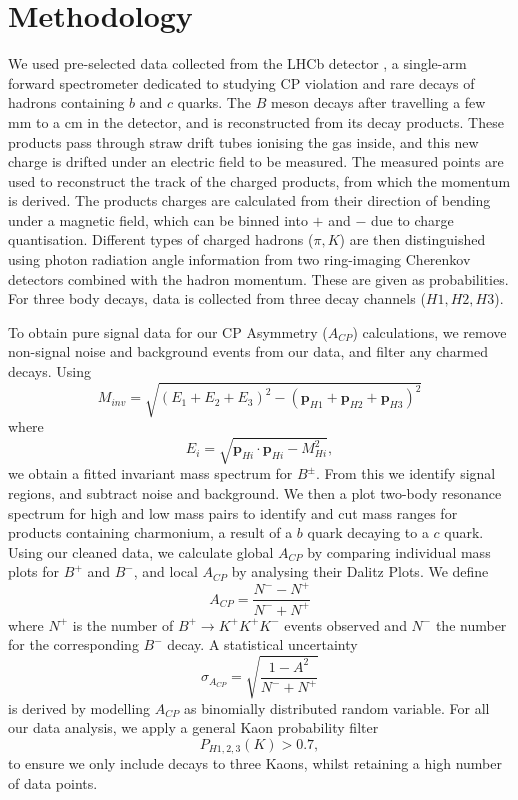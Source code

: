 \documentclass[11pt, twocolumn]{article}
\begin{document}
\section{Methodology}
We used pre-selected data collected from the LHCb detector \cite{cern}, a single-arm forward spectrometer dedicated to studying CP violation and rare decays of hadrons containing $b$ and $c$ quarks. The $B$ meson decays after travelling a few mm to a cm in the detector, and is reconstructed from its decay products. These products pass through straw drift tubes \cite{straw} ionising the gas inside, and this new charge is drifted under an electric field to be measured. The measured points are used to reconstruct the track of the charged products, from which the momentum is derived. The products charges are calculated from their direction of bending under a magnetic field, which can be binned into $+$ and $-$ due to charge quantisation. Different types of charged hadrons ($\pi, K$) are then distinguished using photon radiation angle information from two ring-imaging Cherenkov detectors \cite{cherenkov} combined with the hadron momentum. These are given as probabilities. For three body decays, data is collected from three decay channels ($H1, H2, H3$).

To obtain pure signal data for our CP Asymmetry ($A_{CP}$) calculations, we remove non-signal noise and background events from our data, and filter any charmed decays. Using
\begin{equation}
    M_{inv} = \sqrt{(E_1 + E_2 + E_3)^2 - (\bm{p}_{H1} + \bm{p}_{H2} + \bm{p}_{H3})^2}
\end{equation}
where 
\begin{equation}
    E_i = \sqrt{\bm{p}_{Hi} \cdot \bm{p}_{Hi} - M_{Hi}^2},  
\end{equation}
we obtain a fitted invariant mass spectrum for $B^{\pm}$. From this we identify signal regions, and subtract noise and background. We then a plot two-body resonance spectrum for high and low mass pairs to identify and cut mass ranges for products containing charmonium, a result of a $b$ quark decaying to a $c$ quark. Using our cleaned data, we calculate global $A_{CP}$ by comparing individual mass plots for $B^{+}$ and $B^{-}$, and local $A_{CP}$ by analysing their Dalitz Plots. We define 
\begin{equation}
    A_{CP} = \frac{N^{-}-N^{+}}{N^{-}+N^{+}}
\end{equation}
where $N^{+}$ is the number of $B^{+} \rightarrow K^{+}K^{+}K^{-}$ events observed and $N^{-}$ the number for the corresponding $B^{-}$ decay. A statistical uncertainty
\begin{equation}
\sigma_{A_{CP}}=\sqrt{\frac{1-A^2}{N^{-}+N^{+}}}
\end{equation}
is derived by modelling $A_{CP}$ as binomially distributed random variable. For all our data analysis, we apply a general Kaon probability filter
\begin{equation}
    P_{H1,2,3}(K) > 0.7,
\end{equation}
to ensure we only include decays to three Kaons, whilst retaining a high number of data points.
\end{document}
